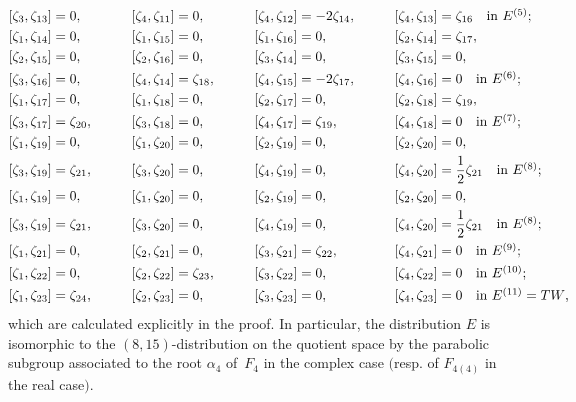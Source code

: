 \begin{Lemma}
\begin{alignat*}{8}
\\
&[\zeta_3, \zeta_{13}] = 0,\qquad&& [\zeta_4, \zeta_{11}] = 0,\qquad&&
[\zeta_4, \zeta_{12}] = -2 \zeta_{14},\qquad&& [\zeta_4, \zeta_{13}] = \zeta_{16} \quad \makebox[0pt][l]{\text{in $E^{(5)}$;}}&
\\
&[\zeta_1, \zeta_{14}] = 0,\qquad&& [\zeta_1, \zeta_{15}] = 0,\qquad&& [\zeta_1, \zeta_{16}] = 0,\qquad&& [\zeta_2, \zeta_{14}] = \zeta_{17},&\\
& [\zeta_2, \zeta_{15}] = 0,\qquad&& [\zeta_2, \zeta_{16}] = 0,\qquad&& [\zeta_3, \zeta_{14}] = 0,\qquad&&[\zeta_3, \zeta_{15}] = 0,&
 \\
&[\zeta_3, \zeta_{16}] = 0,\qquad&& [\zeta_4, \zeta_{14}] = \zeta_{18},\qquad&& [\zeta_4, \zeta_{15}] = -2\zeta_{17},\qquad&&
[\zeta_4, \zeta_{16}] = 0 \quad \makebox[0pt][l]{\text{in $E^{(6)}$;}}&
\\
&[\zeta_1, \zeta_{17}] = 0,\qquad&& [\zeta_1, \zeta_{18}] = 0,\qquad&& [\zeta_2, \zeta_{17}] = 0,\qquad&& [\zeta_2, \zeta_{18}] = \zeta_{19},&\\
&[\zeta_3, \zeta_{17}] = \zeta_{20},\qquad&& [\zeta_3, \zeta_{18}] = 0,\qquad&& [\zeta_4, \zeta_{17}] = \zeta_{19},\qquad&&
 [\zeta_4, \zeta_{18}] = 0 \quad \makebox[0pt][l]{\text{in $E^{(7)}$;}}&
 \\
&[\zeta_1, \zeta_{19}] = 0,\qquad&& [\zeta_1, \zeta_{20}] = 0,\qquad&& [\zeta_2, \zeta_{19}] = 0,\qquad&& [\zeta_2, \zeta_{20}] = 0,&\\
&[\zeta_3, \zeta_{19}] = \zeta_{21},\qquad&& [\zeta_3, \zeta_{20}] = 0,\qquad&&[\zeta_4, \zeta_{19}] = 0,\qquad&&
 [\zeta_4, \zeta_{20}] = \frac{1}{2}\zeta_{21} \quad \makebox[0pt][l]{\text{in $E^{(8)}$;}}&
 \\
&[\zeta_1, \zeta_{19}] = 0,\qquad&& [\zeta_1, \zeta_{20}] = 0,\qquad&& [\zeta_2, \zeta_{19}] = 0,\qquad&& [\zeta_2, \zeta_{20}] = 0,&
 \\
& [\zeta_3, \zeta_{19}] = \zeta_{21},\qquad&& [\zeta_3, \zeta_{20}] = 0,\qquad&&[\zeta_4, \zeta_{19}] = 0,\qquad&&
 [\zeta_4, \zeta_{20}] = \frac{1}{2}\zeta_{21} \quad \makebox[0pt][l]{\text{in $E^{(8)}$;}}&
 \\
&[\zeta_1, \zeta_{21}] = 0,\qquad&& [\zeta_2, \zeta_{21}] = 0,\qquad&& [\zeta_3, \zeta_{21}] = \zeta_{22},\qquad&& [\zeta_4, \zeta_{21}] = 0
 \quad \makebox[0pt][l]{\text{in $E^{(9)}$;}}&
 \\
&[\zeta_1, \zeta_{22}] = 0,\qquad&& [\zeta_2, \zeta_{22}] = \zeta_{23},\qquad&& [\zeta_3, \zeta_{22}] = 0,\qquad&& [\zeta_4, \zeta_{22}] = 0
\quad \makebox[0pt][l]{\text{in $E^{(10)}$;}}&
 \\
&[\zeta_1, \zeta_{23}] = \zeta_{24},\qquad&& [\zeta_2, \zeta_{23}] = 0,\qquad&& [\zeta_3, \zeta_{23}] = 0,\qquad&& [\zeta_4, \zeta_{23}] = 0
 \quad \makebox[0pt][l]{\text{in $E^{(11)} = TW$,}}&
\end{alignat*}
which are calculated explicitly in the proof.
In particular, the distribution $E$ is isomorphic to the $(8, 15)$-distribution on
the quotient space by the parabolic subgroup associated to the root $\alpha_4$ of~$F_4$ in the complex case $($resp.
of $F_{4(4)}$ in the real case$)$.
\end{Lemma}

